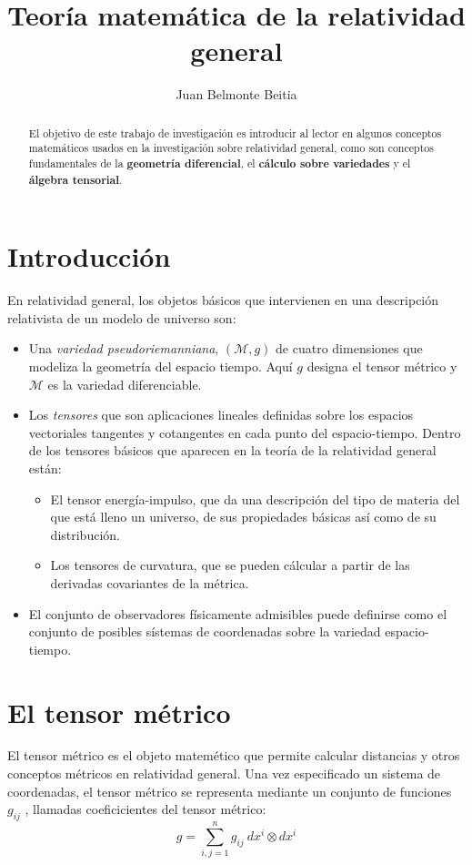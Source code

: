 \documentclass[a4paper,11pt]{article}
\begin{document}
\title{Teoría matemática de la relatividad general}
\author{Juan Belmonte Beitia}
\date{}

\maketitle

\begin{abstract}
El objetivo de este trabajo de investigación es introducir al lector en algunos
conceptos matemáticos usados en la investigación sobre relatividad
general, como son conceptos fundamentales de la \textbf{geometría diferencial},
el \textbf{cálculo sobre variedades} y el \textbf{álgebra tensorial}.
\end{abstract}

\section{Introducción}
En relatividad general, los objetos básicos que intervienen en una descripción
relativista de un modelo de universo son:

\begin{itemize}
\item Una \textit{variedad pseudoriemanniana}, $(\mathcal{M}, g)$ de cuatro dimensiones 
que modeliza la geometría del espacio tiempo. Aquí $g$ designa el tensor métrico y
$\mathcal{M}$ es la variedad diferenciable.

\item Los \textit{tensores} que son aplicaciones lineales definidas sobre los espacios
vectoriales tangentes y cotangentes en cada punto del espacio-tiempo. Dentro
de los tensores básicos que aparecen en la teoría de la relatividad general
están:
\begin{itemize}
\item El tensor energía-impulso, que da una descripción del tipo de materia
del que está lleno un universo, de sus propiedades básicas así como
de su distribución.
\item Los tensores de curvatura, que se pueden cálcular a partir de las
derivadas covariantes de la métrica.
\end{itemize}

\item El conjunto de observadores físicamente admisibles puede definirse como
el conjunto de posibles sístemas de coordenadas sobre la variedad espacio-tiempo.
\end{itemize}

\section{El tensor métrico}
El tensor métrico es el objeto matemético que permite calcular distancias
y otros conceptos métricos en relatividad general. Una vez especificado un 
sistema de coordenadas, el tensor métrico se representa mediante un conjunto
de funciones $g_{ij}$ , llamadas coeficicientes del tensor métrico:
\begin{equation}
\label{eq:metric}
g = \sum_{i,j=1}^n g_{ij}\ dx^i\otimes dx^i
\end{equation}
\end{document}
